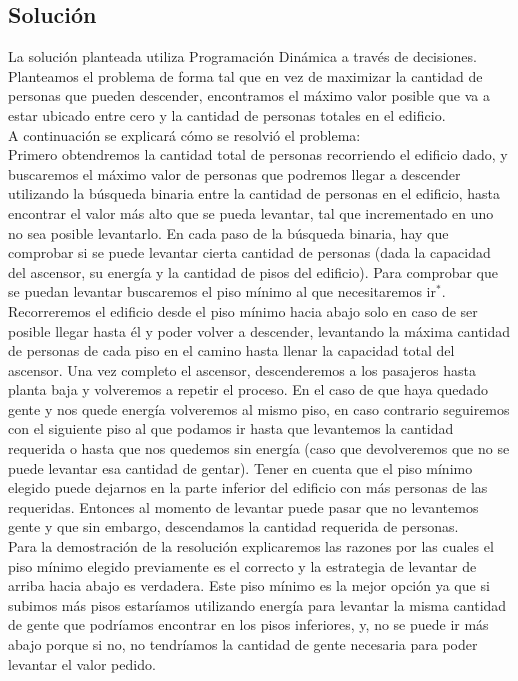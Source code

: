 \subsection{Soluci\'on}
La solución planteada utiliza Programación Dinámica a través de decisiones. Planteamos el problema de forma tal que en vez de maximizar la cantidad de personas que 
pueden descender, encontramos el máximo valor posible que va a estar ubicado entre cero y la cantidad de personas totales en el edificio.\\
A continuación se explicará cómo se resolvió el problema:\\
Primero obtendremos la cantidad total de personas recorriendo el edificio dado, y buscaremos el máximo valor de personas que podremos llegar a descender  utilizando la búsqueda binaria entre la cantidad de personas en el edificio, hasta encontrar el valor más alto que se pueda levantar, tal que incrementado en uno no sea posible levantarlo.
En cada paso de la búsqueda binaria, hay que comprobar si se puede levantar cierta cantidad de personas (dada la capacidad del ascensor, su energía y la cantidad de pisos del edificio).
Para comprobar que se puedan levantar buscaremos el piso mínimo al que necesitaremos ir$^*$. Recorreremos el edificio desde el piso mínimo hacia abajo solo en caso de ser posible llegar hasta él y poder volver a descender, levantando la máxima cantidad de personas de cada piso en el camino hasta llenar la capacidad total del ascensor. Una vez completo el ascensor, descenderemos a los pasajeros hasta planta baja y volveremos a repetir el proceso. En el caso de que haya quedado gente y nos quede energía volveremos al mismo piso, en caso contrario seguiremos con el siguiente piso al que podamos ir hasta que levantemos la cantidad requerida o hasta que nos quedemos sin energía (caso que devolveremos que no se puede levantar esa cantidad de gentar). Tener en cuenta que el piso mínimo elegido puede dejarnos en la parte inferior del edificio con más personas de las requeridas. Entonces al momento de levantar puede pasar que no levantemos gente y que sin embargo, descendamos la cantidad requerida de personas.\\
Para la demostración de la resolución explicaremos las razones por las cuales el piso mínimo elegido previamente es el correcto y la estrategia de levantar de arriba hacia abajo es verdadera.
Este piso mínimo es la mejor opción ya que si subimos más pisos estaríamos utilizando energía para levantar la misma cantidad de gente que podríamos encontrar en los pisos
inferiores, y, no se puede ir más abajo porque si no, no tendríamos la cantidad de gente necesaria para poder levantar el valor pedido.\\
